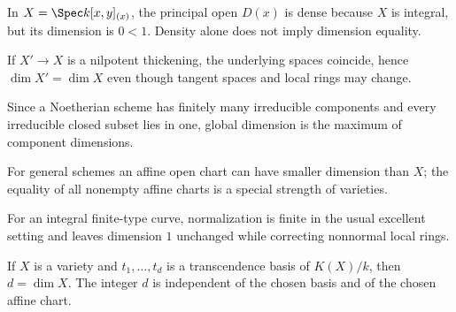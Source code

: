 \begin{example}\label{ex:vi30-adv-09}
In $X=\Spec k[x,y]_{(x)}$, the principal open $D(x)$ is dense because $X$ is integral, but its dimension is $0<1$. Density alone does not imply dimension equality.
\end{example}

\begin{example}\label{ex:vi30-adv-10}
If $X'\to X$ is a nilpotent thickening, the underlying spaces coincide, hence $\dim X'=\dim X$ even though tangent spaces and local rings may change.
\end{example}

\begin{example}\label{ex:vi30-adv-11}
Since a Noetherian scheme has finitely many irreducible components and every irreducible closed subset lies in one, global dimension is the maximum of component dimensions.
\end{example}

\begin{example}\label{ex:vi30-adv-12}
For general schemes an affine open chart can have smaller dimension than $X$; the equality of all nonempty affine charts is a special strength of varieties.
\end{example}

\begin{example}\label{ex:vi30-adv-13}
For an integral finite-type curve, normalization is finite in the usual excellent setting and leaves dimension $1$ unchanged while correcting nonnormal local rings.
\end{example}

\begin{example}\label{ex:vi30-adv-14}
If $X$ is a variety and $t_1,\ldots,t_d$ is a transcendence basis of $K(X)/k$, then $d=\dim X$. The integer $d$ is independent of the chosen basis and of the chosen affine chart.
\end{example}